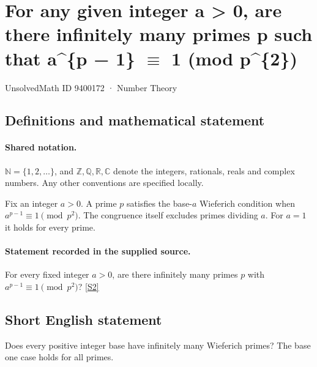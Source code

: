 \documentclass[11pt]{article}
\newcommand{\sref}[2]{\hyperlink{source:#1:#2}{[S#2]}}
\begin{document}
\setcounter{section}{9400171}
\section{\texorpdfstring{For any given integer a > 0, are there infinitely many primes p such that a\textasciicircum{}\{p − 1\} $\equiv$ 1 (mod p\textasciicircum{}\{2\})}{For any given integer a > 0, are there infinitely many primes p such that a\textasciicircum{}\{p − 1\} congruent to 1 (mod p\textasciicircum{}\{2\})}}\label{9400172}
{\small\sffamily UnsolvedMath ID 9400172 · Number Theory}
\subsection{Definitions and mathematical statement}

\paragraph{Shared notation.}$\mathbb N=\{1,2,\ldots\}$, and $\mathbb Z,\mathbb Q,\mathbb R,\mathbb C$ denote the integers, rationals, reals and complex numbers. Any other conventions are specified locally.


Fix an integer $a>0$. A prime $p$ satisfies the base-$a$ Wieferich condition when $a^{p-1}\equiv1\pmod{p^2}$. The congruence itself excludes primes dividing $a$. For $a=1$ it holds for every prime.
\paragraph{Statement recorded in the supplied source.}
For every fixed integer $a>0$, are there infinitely many primes $p$ with $a^{p-1}\equiv1\pmod{p^2}$? \sref{9400172}{2}
\subsection{Short English statement}
Does every positive integer base have infinitely many Wieferich primes? The base one case holds for all primes.
\end{document}
